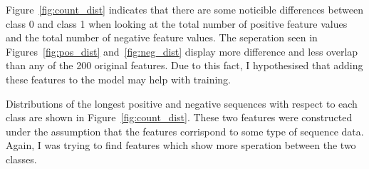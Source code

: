 \documentclass[11pt,letterpaper]{article}
\begin{document}
Figure~\ref{fig:count_dist} indicates that there are some noticible differences
between class 0 and class 1 when looking at the total number of positive feature
values and the total number of negative feature values. The seperation seen in
Figures~\ref{fig:pos_dist} and~\ref{fig:neg_dist} display more difference and
less overlap than any of the 200 original features.  Due to this fact, I
hypothesised that adding these features to the model may help with training. 

Distributions of the longest positive and negative sequences with respect to
each class are shown in Figure~\ref{fig:count_dist}.  These two features were
constructed under the assumption that the features corrispond to some type of
sequence data.  Again, I was trying to find features which show more speration
between the two classes.
\end{document}
